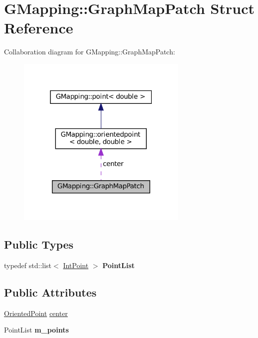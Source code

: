 \hypertarget{structGMapping_1_1GraphMapPatch}{}\section{G\+Mapping\+:\+:Graph\+Map\+Patch Struct Reference}
\label{structGMapping_1_1GraphMapPatch}


Collaboration diagram for G\+Mapping\+:\+:Graph\+Map\+Patch\+:
\nopagebreak
\begin{figure}[H]
\begin{center}
\leavevmode
\includegraphics[width=232pt]{structGMapping_1_1GraphMapPatch__coll__graph}
\end{center}
\end{figure}
\subsection*{Public Types}
\begin{DoxyCompactItemize}
\item 
\mbox{\label{structGMapping_1_1GraphMapPatch_a9389fd44936a481f128dcd73e0683600}} 
typedef std\+::list$<$ \hyperlink{structGMapping_1_1point}{Int\+Point} $>$ {\bfseries Point\+List}
\end{DoxyCompactItemize}
\subsection*{Public Attributes}
\begin{DoxyCompactItemize}
\item 
\hyperlink{structGMapping_1_1orientedpoint}{Oriented\+Point} \hyperlink{structGMapping_1_1GraphMapPatch_a4bf62b1576ad0bfbf58cbb2ca9d4b6c8}{center}
\item 
\mbox{\label{structGMapping_1_1GraphMapPatch_ac9a6aa1ae82137b80e28ade7272dd98f}} 
Point\+List {\bfseries m\+\_\+points}
\end{DoxyCompactItemize}



